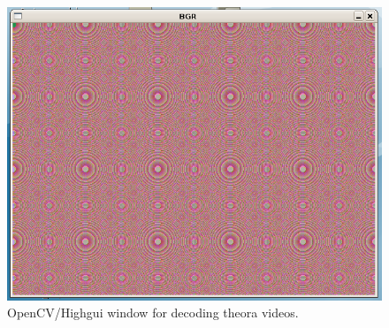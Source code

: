 \documentclass{article}
\begin{document}
\begin{figure}[H]
\centering
\includegraphics[scale=0.5]{opencv-hg}
\caption{\label{opencv-hg}OpenCV/Highgui window for decoding theora
videos.}
\end{figure}





\begin{verbatim}
  
\end{verbatim}
\end{document}
